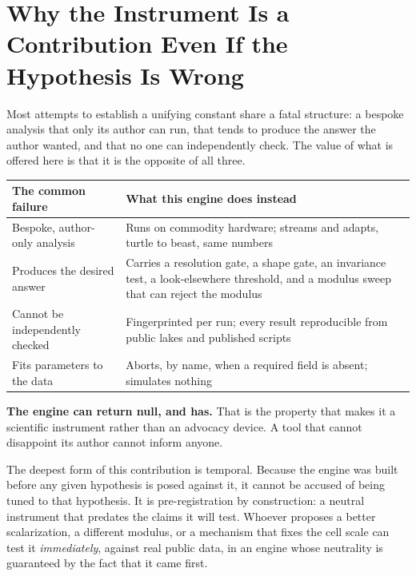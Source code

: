 \documentclass[11pt, letterpaper, openany]{book}
\begin{document}
\section{Why the Instrument Is a Contribution Even If the Hypothesis Is Wrong}

Most attempts to establish a unifying constant share a fatal structure: a bespoke analysis that
only its author can run, that tends to produce the answer the author wanted, and that no one can
independently check. The value of what is offered here is that it is the opposite of all three.

\begin{table}[H]
\centering
\small
\begin{tabular}{@{}p{}p{}@{}}
\toprule
\textbf{The common failure} & \textbf{What this engine does instead} \\
\midrule
Bespoke, author-only analysis & Runs on commodity hardware; streams and adapts, turtle to beast, same numbers \\
Produces the desired answer & Carries a resolution gate, a shape gate, an invariance test, a look-elsewhere threshold, and a modulus sweep that can reject the modulus \\
Cannot be independently checked & Fingerprinted per run; every result reproducible from public lakes and published scripts \\
Fits parameters to the data & Aborts, by name, when a required field is absent; simulates nothing \\
\bottomrule
\end{tabular}
\end{table}

\begin{signalbox}
\textbf{The engine can return null, and has.} That is the property that makes it a scientific
instrument rather than an advocacy device. A tool that cannot disappoint its author cannot inform
anyone.
\end{signalbox}

The deepest form of this contribution is temporal. Because the engine was built before any given
hypothesis is posed against it, it cannot be accused of being tuned to that hypothesis. It is
pre-registration by construction: a neutral instrument that predates the claims it will test.
Whoever proposes a better scalarization, a different modulus, or a mechanism that fixes the cell
scale can test it \emph{immediately}, against real public data, in an engine whose neutrality is
guaranteed by the fact that it came first.
\end{document}
